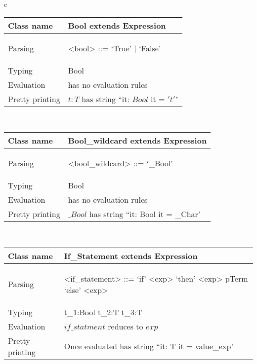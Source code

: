 \documentclass[12pt]{article}
\begin{document}
\begin{tabular}{c}

\begin{tabular}{|l|p{15cm}|}
\hline
Class name & Bool extends Expression \\
\hline
Parsing & 
\begin{grammar}
<bool> ::=  `True' | `False'
\end{grammar}  \\
\hline
Typing &  Bool
\\
\hline
Evaluation &  has no evaluation rules \\
\hline
Pretty printing &  $t:T$  has string  ``it: $Bool$   it = $'t'$" \\
\hline
\end{tabular} 

\\

\begin{tabular}{|l|p{15cm}|}
\hline
\hline
Class name & Bool_wildcard extends Expression \\
\hline
Parsing & 
\begin{grammar}
<bool_wildcard> ::=  `_Bool'
\end{grammar}  \\
\hline
Typing &  Bool
\\
\hline
Evaluation &  has no evaluation rules \\
\hline
Pretty printing &  $\_Bool$  has string  ``it: Bool it = _Char" \\
\hline
\end{tabular} 
\\
\begin{tabular}{|l|p{15cm}|}
\hline
\hline
Class name & If_Statement extends Expression \\
\hline
Parsing & 
\begin{grammar}
<if_statement> ::= `if' <exp> `then' <exp> pTerm `else' <exp>
\end{grammar}
 \\
\hline
Typing &  \infer[]
       {\Gamma \; \vdash \text{if} \; t_1 \text{ then } t_2 \text{ else } t_3 : T } 
       {\Gamma \; \vdash t_1:Bool \;\; \Gamma \; \vdash t_2:T \;\; \Gamma \; \vdash t_3:T}
\\
\hline
Evaluation & $if\_statment$ reduces to $exp$ \\
\hline
Pretty printing &  Once evaluated  has string  ``it: T it = value_exp" \\
\hline
\end{tabular} 

\end{tabular}
\end{document}
